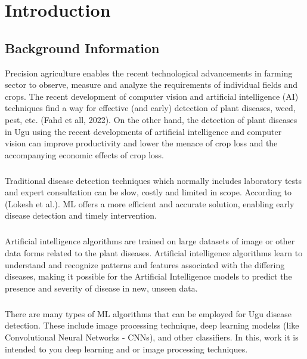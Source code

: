 \chapter{Introduction}
\section{Background Information}
Precision agriculture enables the recent technological advancements in farming sector to observe, measure and analyze the requirements of individual fields and crops. The recent development of computer vision and artificial intelligence (AI) techniques find a way for effective (and early) detection of plant diseases, weed, pest, etc. (Fahd et all, 2022). On the other hand, the detection of plant diseases in Ugu using the recent developments of artificial intelligence and computer vision can improve productivity and lower the menace of crop loss and the accompanying economic effects of crop loss. 

\paragraph*{}Traditional disease detection techniques which normally includes laboratory tests and expert consultation can be slow, costly and limited in scope. According to (Lokesh et al.). ML offers a more efficient and accurate solution, enabling early disease detection and timely intervention.

\paragraph*{} Artificial intelligence algorithms are trained on large datasets of image or other data forms related to the plant diseases. Artificial intelligence algorithms learn to understand and recognize patterns and features associated with the differing diseases, making it possible for the Artificial Intelligence models to predict the presence and severity of disease in new, unseen data.

\paragraph*{} There are many types of ML algorithms that can be employed for Ugu disease detection. These include image processing technique, deep learning modelss (like Convolutional Neural Networks - CNNs), and other classifiers. In this, work it is intended to you deep learning and or image processing techniques. 

